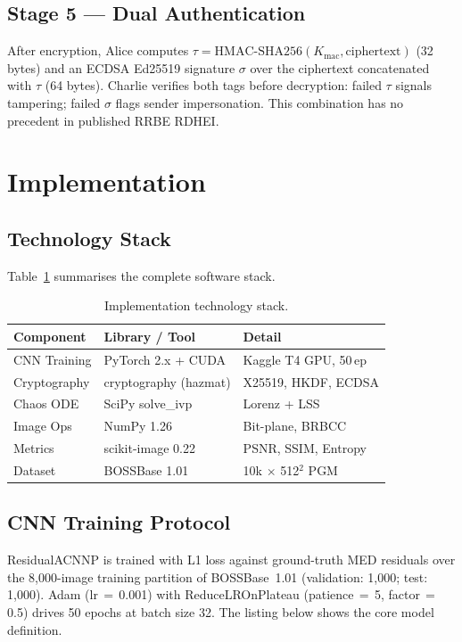 \documentclass[runningheads]{llncs}
\begin{document}
\subsection{Stage 5 — Dual Authentication}
After encryption, Alice computes
$\tau=\mathrm{HMAC\text{-}SHA256}(K_\text{mac},\text{ciphertext})$
(32 bytes) and an ECDSA Ed25519 signature $\sigma$ over the
ciphertext concatenated with $\tau$ (64 bytes). Charlie
verifies both tags before decryption: failed $\tau$ signals
tampering; failed $\sigma$ flags sender impersonation.
This combination has no precedent in published RRBE RDHEI.

\section{Implementation}
\label{sec:implementation}

\subsection{Technology Stack}
Table~\ref{tab:tech} summarises the complete software stack.

\begin{table}[t]
\centering
\caption{Implementation technology stack.}
\label{tab:tech}
\begin{tabularx}{\columnwidth}{@{}lXl@{}}
\toprule
\textbf{Component} & \textbf{Library / Tool} & \textbf{Detail}\\
\midrule
CNN Training    & PyTorch 2.x + CUDA   & Kaggle T4 GPU, 50\,ep\\
Cryptography    & cryptography (hazmat) & X25519, HKDF, ECDSA\\
Chaos ODE       & SciPy solve\_ivp      & Lorenz + LSS\\
Image Ops       & NumPy 1.26           & Bit-plane, BRBCC\\
Metrics         & scikit-image 0.22    & PSNR, SSIM, Entropy\\
Dataset         & BOSSBase 1.01        & 10k $\times$ 512$^2$ PGM\\
\bottomrule
\end{tabularx}
\end{table}

\subsection{CNN Training Protocol}
ResidualACNNP is trained with L1 loss against ground-truth
MED residuals over the 8,000-image training partition
of BOSSBase~1.01 (validation: 1,000; test: 1,000).
Adam (lr\,$=$\,0.001) with ReduceLROnPlateau
(patience\,$=$\,5, factor\,$=$\,0.5) drives 50 epochs
at batch size 32. The listing below shows the core model
definition.
\end{document}
